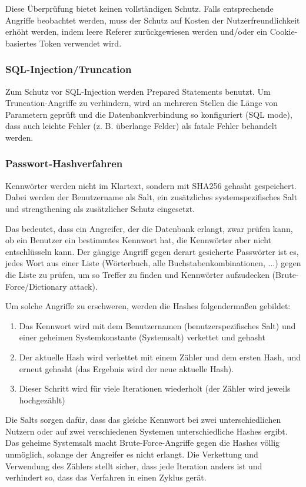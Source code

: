 Diese Überprüfung bietet keinen vollständigen Schutz.
Falls entsprechende Angriffe beobachtet werden, muss der Schutz auf Kosten der Nutzerfreundlichkeit erhöht werden,
indem leere Referer zurückgewiesen werden und/oder ein Cookie-basiertes Token verwendet wird.

\subsubsection{SQL-Injection/Truncation}
Zum Schutz vor SQL-Injection werden Prepared Statements benutzt.
Um Truncation-Angriffe zu verhindern, wird an mehreren Stellen die Länge von Parametern geprüft
und die Datenbankverbindung so konfiguriert (SQL mode), dass auch leichte Fehler (z. B. überlange Felder) als fatale Fehler behandelt werden.

\subsubsection{Passwort-Hashverfahren}
\label{sec:pwhash}
Kennwörter werden nicht im Klartext, sondern mit SHA256 gehasht gespeichert.
Dabei werden der Benutzername als Salt, ein zusätzliches systemspezifisches Salt und strengthening als zusätzlicher Schutz eingesetzt.

Das bedeutet, dass ein Angreifer, der die Datenbank erlangt, zwar prüfen kann, ob ein Benutzer ein bestimmtes Kennwort hat,
die Kennwörter aber nicht entschlüsseln kann.
Der gängige Angriff gegen derart gesicherte Passwörter ist es, jedes Wort aus einer Liste (Wörterbuch, alle Buchstabenkombinationen, ...)
gegen die Liste zu prüfen, um so Treffer zu finden und Kennwörter aufzudecken (Brute-Force/Dictionary attack).

Um solche Angriffe zu erschweren, werden die Hashes folgendermaßen gebildet:
\begin{enumerate}
	\item Das Kennwort wird mit dem Benutzernamen (benutzerspezifisches Salt) und einer geheimen Systemkonstante (Systemsalt) verkettet und gehasht
	\item Der aktuelle Hash wird verkettet mit einem Zähler und dem ersten Hash, und erneut gehasht (das Ergebnis wird der neue aktuelle Hash).
	\item Dieser Schritt wird für viele Iterationen wiederholt (der Zähler wird jeweils hochgezählt)
\end{enumerate}

Die Salts sorgen dafür, dass das gleiche Kennwort bei zwei unterschiedlichen Nutzern oder auf zwei verschiedenen Systemen unterschiedliche Hashes ergibt.
Das geheime Systemsalt macht Brute-Force-Angriffe gegen die Hashes völlig unmöglich, solange der Angreifer es nicht erlangt.
Die Verkettung und Verwendung des Zählers stellt sicher, dass jede Iteration anders ist und verhindert so, dass das Verfahren in einen Zyklus gerät.

